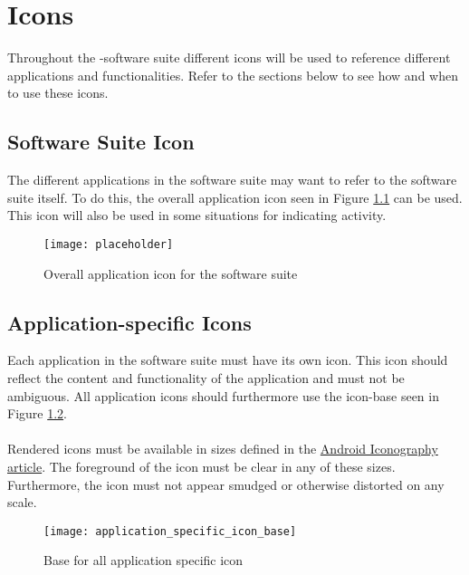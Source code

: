 
\chapter{Icons}

Throughout the \giraf-software suite different icons will be used to reference different applications and functionalities. Refer to the sections below to see how and when to use these icons.

\section{\giraf Software Suite Icon}
The different applications in the \giraf software suite may want to refer to the software suite itself. To do this, the overall application icon seen in Figure \ref{fig:overall_application_icon} can be used. This icon will also be used in some situations for indicating activity. 

\begin{figure}[h]
	\centering
	\texttt{[image: placeholder]}
	\caption{Overall application icon for the \giraf software suite}
	\label{fig:overall_application_icon}
\end{figure}

\section{Application-specific Icons}
Each application in the \giraf software suite must have its own icon. This icon should reflect the content and functionality of the application and must not be ambiguous. All application icons should furthermore use the icon-base seen in Figure \ref{fig:application_specific_icon_base}. 
\\\\
Rendered icons must be available in sizes defined in the \href{http://developer.android.com/design/style/iconography.html}{Android Iconography article}. The foreground of the icon must be clear in any of these sizes. Furthermore, the icon must not appear smudged or otherwise distorted on any scale.

\begin{figure}[h]
	\centering
	\texttt{[image: application\_specific\_icon\_base]}
	\caption{Base for all application specific icon}
	\label{fig:application_specific_icon_base}
\end{figure}

